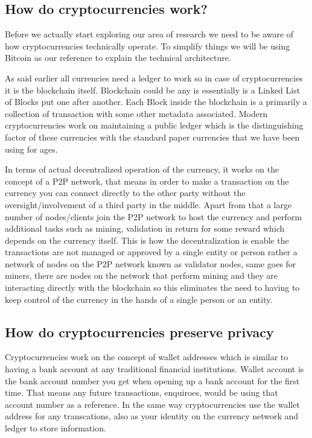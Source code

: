 \documentclass{article}
\begin{document}
\pagebreak

    \subsection{How do cryptocurrencies work?}
    
    
        Before we actually start exploring our area of research we need to be aware of how cryptocurrencies technically operate. To simplify things we will be using Bitcoin as our reference to explain the technical architecture.

        As said earlier all currencies need a ledger to work so in case of cryptocurrencies it is the blockchain itself. Blockchain could be any is essentially is a Linked List \cite{} of Blocks put one after another. Each Block inside the blockchain is a primarily a collection of transaction with some other metadata associated. Modern cryptocurrencies work on maintaining a public ledger which is the distinguishing factor of these currencies with the standard paper currencies that we have been using for ages. 

        In terms of actual decentralized operation of the currency, it works on the concept of a P2P network, that means in order to make a transaction on the currency you can connect directly to the other party without the oversight/involvement of a third party in the middle. Apart from that a large number of nodes/clients join the P2P network to host the currency and perform additional tasks such as mining, validation in return for some reward which depends on the currency itself. This is how the decentralization is enable the transactions are not managed or approved by a single entity or person rather a network of nodes on the P2P network known as validator nodes, same goes for miners, there are nodes on the network that perform mining and they are interacting directly with the blockchain so this eliminates the need to having to keep control of the currency in the hands of a single person or an entity.

\pagebreak

    \subsection{How do cryptocurrencies preserve privacy}

        Cryptocurrencies work on the concept of wallet addresses which is similar to having a bank account at any traditional financial institutions. Wallet account is the bank account number you get when opening up a bank account for the first time. That means any future transactions, enquiroes, would be using that account number as a reference. In the same way cryptocurrencies use the wallet address for any transcations, also as your identity on the currency network and ledger to store information. 
\end{document}
